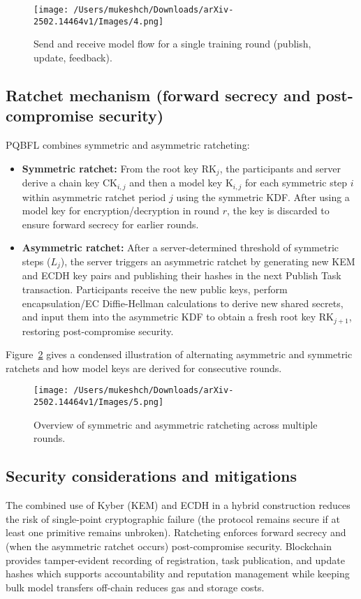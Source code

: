 \documentclass[11pt]{article}
\begin{document}
\begin{figure}[H]
  \centering
  \texttt{[image: /Users/mukeshch/Downloads/arXiv-2502.14464v1/Images/4.png]}
  \caption{Send and receive model flow for a single training round (publish, update, feedback).}
  \label{fig:send_receive}
\end{figure}

\subsection*{Ratchet mechanism (forward secrecy and post-compromise security)}
PQBFL combines symmetric and asymmetric ratcheting:
\begin{itemize}
  \item \textbf{Symmetric ratchet:} From the root key $\mathrm{RK}_j$, the participants and server derive a chain key $\mathrm{CK}_{i,j}$ and then a model key $\mathrm{K}_{i,j}$ for each symmetric step $i$ within asymmetric ratchet period $j$ using the symmetric KDF. After using a model key for encryption/decryption in round $r$, the key is discarded to ensure forward secrecy for earlier rounds.
  \item \textbf{Asymmetric ratchet:} After a server-determined threshold of symmetric steps ($L_j$), the server triggers an asymmetric ratchet by generating new KEM and ECDH key pairs and publishing their hashes in the next Publish Task transaction. Participants receive the new public keys, perform encapsulation/EC Diffie-Hellman calculations to derive new shared secrets, and input them into the asymmetric KDF to obtain a fresh root key $\mathrm{RK}_{j+1}$, restoring post-compromise security.
\end{itemize}

Figure~\ref{fig:ratchet} gives a condensed illustration of alternating asymmetric and symmetric ratchets and how model keys are derived for consecutive rounds.

\begin{figure}[H]
  \centering
  \texttt{[image: /Users/mukeshch/Downloads/arXiv-2502.14464v1/Images/5.png]}
  \caption{Overview of symmetric and asymmetric ratcheting across multiple rounds.}
  \label{fig:ratchet}
\end{figure}

\subsection*{Security considerations and mitigations}
The combined use of Kyber (KEM) and ECDH in a hybrid construction reduces the risk of single-point cryptographic failure (the protocol remains secure if at least one primitive remains unbroken). Ratcheting enforces forward secrecy and (when the asymmetric ratchet occurs) post-compromise security. Blockchain provides tamper-evident recording of registration, task publication, and update hashes which supports accountability and reputation management while keeping bulk model transfers off-chain reduces gas and storage costs.
\end{document}
